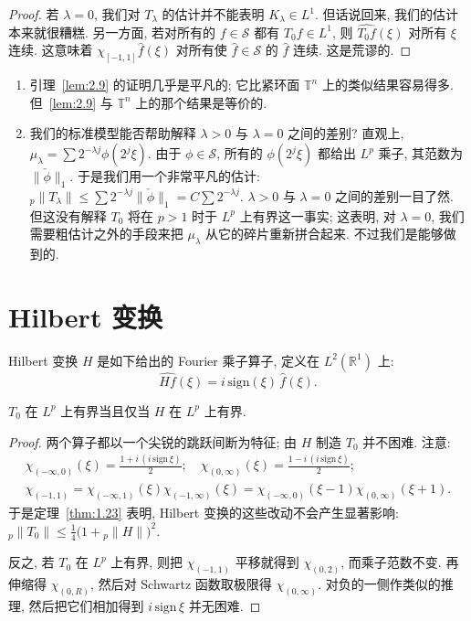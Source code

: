 \begin{proof}
若 $\lambda=0$, 我们对 $T_\lambda$ 的估计并不能表明 $K_\lambda\in L^1$. 但话说回来, 我们的估计本来就很糟糕. 另一方面, 若对所有的 $f\in\mathcal{S}$ 都有 $T_0 f\in L^1$, 则 $\widehat{T_0 f}(\xi)$ 对所有 $\xi$ 连续. 这意味着 $\chi_{[-1,1]}\hat{f}(\xi)$ 对所有使 $\hat{f}\in\mathcal{S}$ 的 $\hat{f}$ 连续. 这是荒谬的.
\end{proof}

\begin{remark}\label{rem:2.10}
\begin{enumerate}[label=\alph*)]
\item 引理~\ref{lem:2.9} 的证明几乎是平凡的; 它比紧环面 $\mathbb{T}^{n}$ 上的类似结果容易得多. 但~\ref*{lem:2.9} 与 $\mathbb{T}^{n}$ 上的那个结果是等价的.
\item 我们的标准模型能否帮助解释 $\lambda>0$ 与 $\lambda=0$ 之间的差别? 直观上, $\mu_{\lambda}=\sum 2^{-\lambda j}\phi(2^j\xi)$. 由于 $\phi\in\mathcal{S}$, 所有的 $\phi(2^j\xi)$ 都给出 $L^p$ 乘子, 其范数为 $\|\check{\phi}\|_1$. 于是我们用一个非常平凡的估计: ${}_p\|T_{\lambda}\|\leq\sum 2^{-\lambda j}\|\check{\phi}\|_1=C\sum 2^{-\lambda j}$. $\lambda>0$ 与 $\lambda=0$ 之间的差别一目了然. 但这没有解释 $T_0$ 将在 $p>1$ 时于 $L^p$ 上有界这一事实; 这表明, 对 $\lambda=0$, 我们需要粗估计之外的手段来把 $\mu_\lambda$ 从它的碎片重新拼合起来. 不过我们是能够做到的.
\end{enumerate}
\end{remark}

\section{Hilbert 变换}
\label{sec:2.2}

\begin{definition}\label{def:2.11}
Hilbert 变换 $H$ 是如下给出的 Fourier 乘子算子, 定义在 $L^2(\mathbb{R}^1)$ 上:
\[
\widehat{Hf}(\xi)=i\,\mathrm{sign}(\xi)\,\hat{f}(\xi).
\]
\end{definition}

\begin{lemma}\label{lem:2.12}
$T_{0}$ 在 $L^{p}$ 上有界当且仅当 $H$ 在 $L^{p}$ 上有界.
\end{lemma}

\begin{proof}
两个算子都以一个尖锐的跳跃间断为特征; 由 $H$ 制造 $T_0$ 并不困难. 注意:
\begin{gather*}
\chi_{(-\infty,0)}(\xi)=\frac{1+i\,(i\,\mathrm{sign}\,\xi)}{2};\quad
\chi_{(0,\infty)}(\xi)=\frac{1-i\,(i\,\mathrm{sign}\,\xi)}{2}; \\
\chi_{(-1,1)}=\chi_{(-\infty,1)}(\xi)\chi_{(-1,\infty)}(\xi)
=\chi_{(-\infty,0)}(\xi-1)\chi_{(0,\infty)}(\xi+1).
\end{gather*}
于是定理~\ref{thm:1.23} 表明, Hilbert 变换的这些改动不会产生显著影响: ${}_p\|T_0\|\leq\frac{1}{4}\bigl(1+{}_p\|H\|\bigr)^2$.

反之, 若 $T_0$ 在 $L^p$ 上有界, 则把 $\chi_{(-1,1)}$ 平移就得到 $\chi_{(0,2)}$, 而乘子范数不变. 再伸缩得 $\chi_{(0,R)}$, 然后对 Schwartz 函数取极限得 $\chi_{(0,\infty)}$. 对负的一侧作类似的推理, 然后把它们相加得到 $i\,\mathrm{sign}\,\xi$ 并无困难.
\end{proof}

